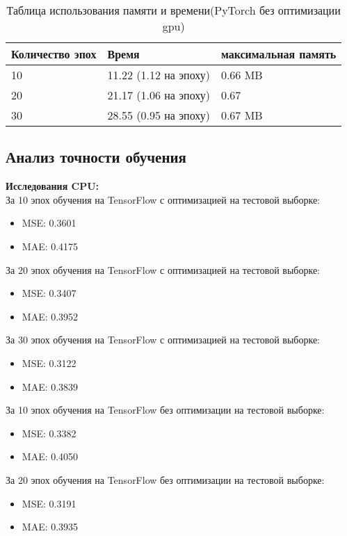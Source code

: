 \documentclass[a4paper,12pt,titlepage,final]{article}
\begin{document}
\begin{table}[H]
\centering
\begin{tabular}{|p{5.4cm}|p{3.8cm}|p{3.8cm}|}
\hline 
Количество эпох & Время & максимальная память\\ 
\hline
10 & 11.22 (1.12 на эпоху) & 0.66 MB \\ [1.5ex]
\hline
20 & 21.17 (1.06 на эпоху) & 0.67 \\ [1.5ex]
\hline
30 & 28.55 (0.95 на эпоху)& 0.67 MB \\ [1.5ex]
\hline
\end{tabular}
\caption{Таблица использования памяти и времени(PyTorch без оптимизации gpu)}
\label{table_mem1}
\end{table}



\newpage
\begin{center}
    \item \subsection{Анализ точности обучения}
\end{center}
\textbf{Исследования CPU:}\\
За 10 эпох обучения на TensorFlow с оптимизацией на тестовой выборке:
\begin{itemize}
    \item MSE: 0.3601
    \item MAE: 0.4175
\end{itemize}
За 20 эпох обучения на TensorFlow с оптимизацией на тестовой выборке:
\begin{itemize}
    \item MSE: 0.3407
    \item MAE: 0.3952
\end{itemize}
За 30 эпох обучения на TensorFlow с оптимизацией на тестовой выборке:
\begin{itemize}
    \item MSE: 0.3122
    \item MAE: 0.3839
\end{itemize}
За 10 эпох обучения на TensorFlow без оптимизации на тестовой выборке:
\begin{itemize}
    \item MSE: 0.3382
    \item MAE: 0.4050
\end{itemize}
За 20 эпох обучения на TensorFlow без оптимизации на тестовой выборке:
\begin{itemize}
    \item MSE: 0.3191
    \item MAE: 0.3935
\end{itemize}
\end{document}

